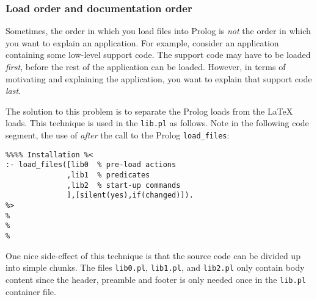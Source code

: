 \subsubsection{Load order and documentation order}

Sometimes, the order in which you load files into Prolog is {\em not}
the order in which you want to explain an application. For example,
consider an application containing some low-level support code. The
support code may have to be loaded {\em first}, before the rest of
the application can be loaded. However, in terms of motivating and
explaining the application, you want to explain that support code
{\em last}.

The solution to this problem is to separate the Prolog loads from the
{\LaTeX} loads. This technique is used in the {\tt lib.pl} as
follows. Note in the following code segment, the use of
\verb++ {\em after} the call to the Prolog
\verb+load_files+:

{\scriptsize \begin{verbatim}
%%%% Installation %<
:- load_files([lib0  % pre-load actions
              ,lib1  % predicates
              ,lib2  % start-up commands
              ],[silent(yes),if(changed)]).
%>
%
%
%
\end{verbatim}}

One nice side-effect of this technique is that the {\PROD} source
code can be divided up into simple chunks. The files {\tt lib0.pl},
{\tt lib1.pl}, and {\tt lib2.pl} only contain {\PROD} body content
since the {\PROD} header, preamble and footer is only needed once in
the {\tt lib.pl} container file.
